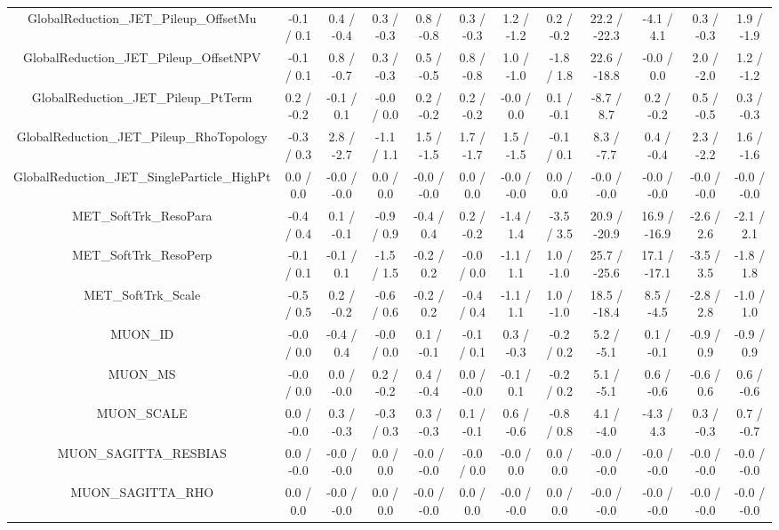 \begin{table}[htbp]
\begin{center}
\begin{tabular}{|c|c|c|c|c|c|c|c|c|c|c|c|}
  GlobalReduction_JET_Pileup_OffsetMu & -0.1 / 0.1 & 0.4 / -0.4 & 0.3 / -0.3 & 0.8 / -0.8 & 0.3 / -0.3 & 1.2 / -1.2 & 0.2 / -0.2 & 22.2 / -22.3 & -4.1 / 4.1 & 0.3 / -0.3 & 1.9 / -1.9 \\ 
  GlobalReduction_JET_Pileup_OffsetNPV & -0.1 / 0.1 & 0.8 / -0.7 & 0.3 / -0.3 & 0.5 / -0.5 & 0.8 / -0.8 & 1.0 / -1.0 & -1.8 / 1.8 & 22.6 / -18.8 & -0.0 / 0.0 & 2.0 / -2.0 & 1.2 / -1.2 \\ 
  GlobalReduction_JET_Pileup_PtTerm & 0.2 / -0.2 & -0.1 / 0.1 & -0.0 / 0.0 & 0.2 / -0.2 & 0.2 / -0.2 & -0.0 / 0.0 & 0.1 / -0.1 & -8.7 / 8.7 & 0.2 / -0.2 & 0.5 / -0.5 & 0.3 / -0.3 \\ 
  GlobalReduction_JET_Pileup_RhoTopology & -0.3 / 0.3 & 2.8 / -2.7 & -1.1 / 1.1 & 1.5 / -1.5 & 1.7 / -1.7 & 1.5 / -1.5 & -0.1 / 0.1 & 8.3 / -7.7 & 0.4 / -0.4 & 2.3 / -2.2 & 1.6 / -1.6 \\ 
  GlobalReduction_JET_SingleParticle_HighPt & 0.0 / 0.0 & -0.0 / -0.0 & 0.0 / 0.0 & -0.0 / -0.0 & 0.0 / 0.0 & -0.0 / -0.0 & 0.0 / 0.0 & -0.0 / -0.0 & -0.0 / -0.0 & -0.0 / -0.0 & -0.0 / -0.0 \\ 
  MET_SoftTrk_ResoPara & -0.4 / 0.4 & 0.1 / -0.1 & -0.9 / 0.9 & -0.4 / 0.4 & 0.2 / -0.2 & -1.4 / 1.4 & -3.5 / 3.5 & 20.9 / -20.9 & 16.9 / -16.9 & -2.6 / 2.6 & -2.1 / 2.1 \\ 
  MET_SoftTrk_ResoPerp & -0.1 / 0.1 & -0.1 / 0.1 & -1.5 / 1.5 & -0.2 / 0.2 & -0.0 / 0.0 & -1.1 / 1.1 & 1.0 / -1.0 & 25.7 / -25.6 & 17.1 / -17.1 & -3.5 / 3.5 & -1.8 / 1.8 \\ 
  MET_SoftTrk_Scale & -0.5 / 0.5 & 0.2 / -0.2 & -0.6 / 0.6 & -0.2 / 0.2 & -0.4 / 0.4 & -1.1 / 1.1 & 1.0 / -1.0 & 18.5 / -18.4 & 8.5 / -4.5 & -2.8 / 2.8 & -1.0 / 1.0 \\ 
  MUON_ID & -0.0 / 0.0 & -0.4 / 0.4 & -0.0 / 0.0 & 0.1 / -0.1 & -0.1 / 0.1 & 0.3 / -0.3 & -0.2 / 0.2 & 5.2 / -5.1 & 0.1 / -0.1 & -0.9 / 0.9 & -0.9 / 0.9 \\ 
  MUON_MS & -0.0 / 0.0 & 0.0 / -0.0 & 0.2 / -0.2 & 0.4 / -0.4 & 0.0 / -0.0 & -0.1 / 0.1 & -0.2 / 0.2 & 5.1 / -5.1 & 0.6 / -0.6 & -0.6 / 0.6 & 0.6 / -0.6 \\ 
  MUON_SCALE & 0.0 / -0.0 & 0.3 / -0.3 & -0.3 / 0.3 & 0.3 / -0.3 & 0.1 / -0.1 & 0.6 / -0.6 & -0.8 / 0.8 & 4.1 / -4.0 & -4.3 / 4.3 & 0.3 / -0.3 & 0.7 / -0.7 \\ 
  MUON_SAGITTA_RESBIAS & 0.0 / -0.0 & -0.0 / -0.0 & 0.0 / 0.0 & -0.0 / -0.0 & -0.0 / 0.0 & -0.0 / 0.0 & 0.0 / 0.0 & -0.0 / -0.0 & -0.0 / -0.0 & -0.0 / -0.0 & -0.0 / -0.0 \\ 
  MUON_SAGITTA_RHO & 0.0 / 0.0 & -0.0 / -0.0 & 0.0 / 0.0 & -0.0 / -0.0 & 0.0 / 0.0 & -0.0 / -0.0 & 0.0 / 0.0 & -0.0 / -0.0 & -0.0 / -0.0 & -0.0 / -0.0 & -0.0 / -0.0 \\ 

\end{tabular}
\end{center}
\end{table}
